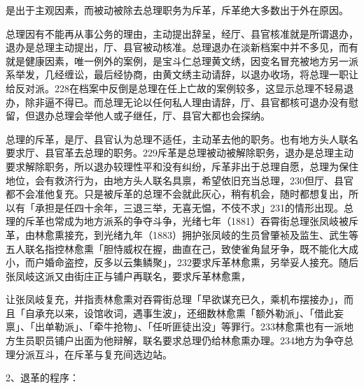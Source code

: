 \noindent 是出于主观因素，而被动被除去总理职务为斥革，斥革绝大多数出于外在原因。


\noindent 总理因有不能再从事公务的理由，主动提出辞呈，经厅、县官核准就是所谓退办，退办是总理主动提出，厅、县官被动核准。总理退办在淡新档案中并不多见，而有就是健康因素，唯一例外的案例，是宝斗仁总理黄文绣，因变名冒充被地方另一派系举发，几经缠讼，最后经协商，由黄文绣主动请辞，以退办收场，将总理一职让给反对派。228在档案中反倒是总理在任上亡故的案例较多，这显示总理不轻易退办，除非逼不得已。而总理无论以任何私人理由请辞，厅、县官都核可退办没有慰留，但退办总理会举他人或子继任，厅、县官大都也会探纳。


\noindent 总理的斥革，是厅、县官认为总理不适任，主动革去他的职务。也有地方头人联名要求厅、县官革去总理的职务。229斥革是总理被动被解除职务，退办是总理主动要求解除职务，所以退办较理性平和没有纠纷，斥革非出于总理自愿，总理为保住地位，会有救济行为，由地方头人联名具禀，希望依旧充当总理，230但厅、县官都不会准他复充。只是被斥革的总理不会就此灰心，稍有机会，随时都想复出，所以有「承担是任四十余年，三退三举，无喜无愠，不伎不求」231的情形出现。总理的斥革也常成为地方派系的争夺斗争，光绪七年（1881）吞霄街总理张凤岐被斥革，由林愈熏接充，到光绪九年（1883）拥护张凤岐的生员曾肇祯及监生、武生等五人联名指控林愈熏「胆恃威权在握，曲直在己，致使雀角鼠牙争，既不能化大成小，而户婚命盗控，反多以云集鳞聚」，232要求斥革林愈熏，另举妥人接充。随后张凤岐这派又由街庄正与铺户再联名，要求斥革林愈熏，

\vfill
\begin{BookNotes}
\end{BookNotes}

\noindent 让张凤岐复充，并指责林愈熏对吞霄街总理「早欲谋充已久，乘机布摆接办」，而且「自承充以来，设馆收词，遇事生波」，还细数林愈熏「额外勒派」、「借此妄禀」、「出单勒派」、「牵牛抢物」、「任听匪徒出没」等罪行。233林愈熏也有一派地方生员职员铺户出面为他辩解，联名要求总理仍给林愈熏办理。234地方为争夺总理分派互斗，在斥革与复充间选边站。

2、退革的程序：


